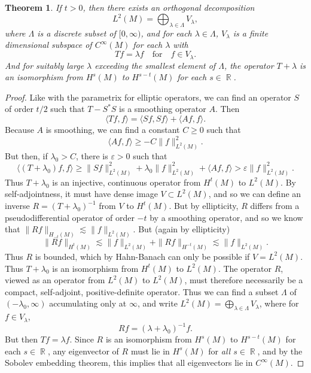 \documentclass{article}
\DeclareMathOperator{\RR}{\mathbb{R}}
\theoremstyle{plain}
\newtheorem{theorem}{Theorem}
\theoremstyle{definition}
\begin{document}
\begin{theorem}
    If $t > 0$, then there exists an orthogonal decomposition
    \[ L^2(M) = \bigoplus_{\lambda \in \Lambda} V_\lambda, \]
    where $\Lambda$ is a discrete subset of $[0,\infty)$, and for each $\lambda \in \Lambda$, $V_\lambda$ is a finite dimensional subspace of $C^\infty(M)$ for each $\lambda$ with
    \[ Tf = \lambda f \quad\text{for}\quad f \in V_\lambda. \]
    And for suitably large $\lambda$ exceeding the smallest element of $\Lambda$, the operator $T + \lambda$ is an isomorphism from $H^s(M)$ to $H^{s-t}(M)$ for each $s \in \RR$.
\end{theorem}
\begin{proof}
Like with the parametrix for elliptic operators, we can find an operator $S$ of order $t/2$ such that $T - S^* S$ is a smoothing operator $A$. Then
%
\[ \langle Tf, f \rangle = \langle Sf, Sf \rangle + \langle Af, f \rangle. \]
%
Because $A$ is smoothing, we can find a constant $C \geq 0$ such that
%
\[ \langle Af, f \rangle \geq - C \| f \|_{L^2(M)}^2. \]
%
But then, if $\lambda_0 > C$, there is $\varepsilon > 0$ such that
%
\[ \Big\langle (T + \lambda_0) f, f \Big\rangle \geq \| Sf \|_{L^2(M)}^2 + \lambda_0 \| f \|_{L^2(M)}^2 + \langle Af, f \rangle > \varepsilon \| f \|_{L^2(M)}^2. \]
%
Thus $T + \lambda_0$ is an injective, continuous operator from $H^t(M)$ to $L^2(M)$. By self-adjointness, it must have dense image $V \subset L^2(M)$, and so we can define an inverse $R = (T + \lambda_0)^{-1}$ from $V$ to $H^t(M)$. But by ellipticity, $R$ differs from a pseudodifferential operator of order $-t$ by a smoothing operator, and so we know that $\| Rf \|_{H_{-t}(M)} \lesssim \| f \|_{L^2(M)}$. But (again by ellipticity)
%
\[ \| Rf \|_{H^t(M)} \lesssim \| f \|_{L^2(M)} + \| Rf \|_{H^{-t}(M)} \lesssim \| f \|_{L^2(M)}. \]
%
Thus $R$ is bounded, which by Hahn-Banach can only be possible if $V = L^2(M)$. Thus $T + \lambda_0$ is an isomorphism from $H^t(M)$ to $L^2(M)$. The operator $R$, viewed as an operator from $L^2(M)$ to $L^2(M)$, must therefore necessarily be a compact, self-adjoint, positive-definite operator. Thus  we can find a subset $\Lambda$ of $(-\lambda_0,\infty)$ accumulating only at $\infty$, and write $L^2(M) = \bigoplus_{\lambda \in \Lambda} V_\lambda$, where for $f \in V_\lambda$,
%
\[ Rf = (\lambda + \lambda_0)^{-1} f. \]
%
But then $Tf = \lambda f$. Since $R$ is an isomorphism from $H^s(M)$ to $H^{s-t}(M)$ for each $s \in \RR$, any eigenvector of $R$ must lie in $H^s(M)$ for \emph{all $s \in \RR$}, and by the Sobolev embedding theorem, this implies that all eigenvectors lie in $C^\infty(M)$.
\end{proof}
\end{document}
